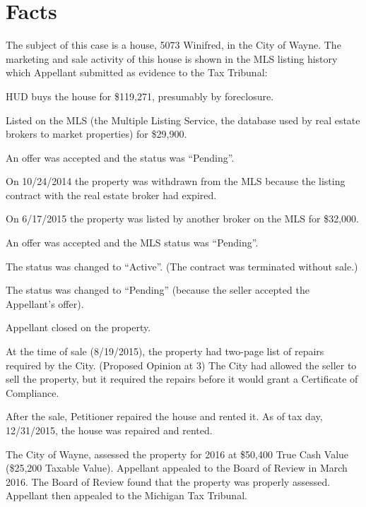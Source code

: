 \section{Facts}
The subject of this case is a house, 5073 Winifred, in the City of Wayne. The marketing and sale activity of this house is shown in the MLS listing history which Appellant submitted as evidence to the Tax Tribunal:


\begin{description}[style=multiline,leftmargin=3.5cm,font=\normalfont,itemsep=.5\baselineskip,align=right]
\singlespacing
\item[3/16/2005] HUD buys the house for \$119,271, presumably by foreclosure.
\item[4/3/2013] Listed on the MLS (the Multiple Listing Service, the database used by real estate brokers to market properties) for \$29,900.
\item[5/3/2013] An offer was accepted and the status was ``Pending''.
\item[10/24/2013] On 10/24/2014 the property was withdrawn from the MLS because the listing contract with the real estate broker had expired.
\item[6/17/2015] On 6/17/2015 the property was listed by another broker on the MLS for \$32,000.
\item[6/29/2015] An offer was accepted and the MLS status was ``Pending''.
\item[7/3/2015] The status was changed to ``Active''. (The contract was terminated without sale.)
\item[7/6/2015] The status was changed to ``Pending'' (because the seller accepted the Appellant's offer).
\item[8/19/2015] Appellant closed on the property.
\end{description}

At the time of sale (8/19/2015), the property had two-page list of repairs required by the City. (Proposed Opinion at 3) The City had allowed the seller to sell the property, but it required the repairs before it would grant a Certificate of Compliance.

After the sale, Petitioner repaired the house and rented it. As of tax day, 12/31/2015, the house was repaired and rented.

The City of Wayne, assessed the property for 2016 at \$50,400 True Cash Value (\$25,200 Taxable Value). Appellant appealed to the Board of Review in March 2016. The Board of Review found that the property was properly assessed. Appellant then appealed to the Michigan Tax Tribunal.

